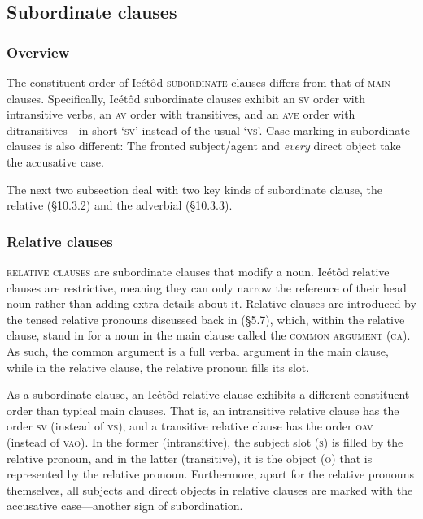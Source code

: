 \begin{table}
\subsection{Subordinate clauses}
\subsubsection{Overview}

The constituent order of Icétôd \textsc{subordinate} clauses differs from that of \textsc{main} clauses. Specifically, Icétôd subordinate clauses exhibit an \textsc{sv} order with intransitive verbs, an \textsc{av} order with transitives, and an \textsc{ave} order with ditransitives—in short ‘\textsc{sv}’ instead of the usual ‘\textsc{vs}’. Case marking in subordinate clauses is also different: The fronted subject/agent and \textit{every} direct object take the accusative case. 

The next two subsection deal with two key kinds of subordinate clause, the relative (§10.3.2) and the adverbial (§10.3.3).


\subsubsection{Relative clauses}

\textsc{relative clauses} are subordinate clauses that modify a noun. Icétôd relative clauses are restrictive, meaning they can only narrow the reference of their head noun rather than adding extra details about it. Relative clauses are introduced by the tensed relative pronouns discussed back in (§5.7), which, within the relative clause, stand in for a noun in the main clause called the \textsc{common argument }(\textsc{ca}). As such, the common argument is a full verbal argument in the main clause, while in the relative clause, the relative pronoun fills its slot.

As a subordinate clause, an Icétôd relative clause exhibits a different constituent order than typical main clauses. That is, an intransitive relative clause has the order \textsc{sv} (instead of \textsc{vs}), and a transitive relative clause has the order \textsc{oav} (instead of \textsc{vao}). In the former (intransitive), the subject slot (\textsc{s}) is filled by the relative pronoun, and in the latter (transitive), it is the object (\textsc{o}) that is represented by the relative pronoun. Furthermore, apart for the relative pronouns themselves, all subjects and direct objects in relative clauses are marked with the accusative case—another sign of subordination.


\end{table}
